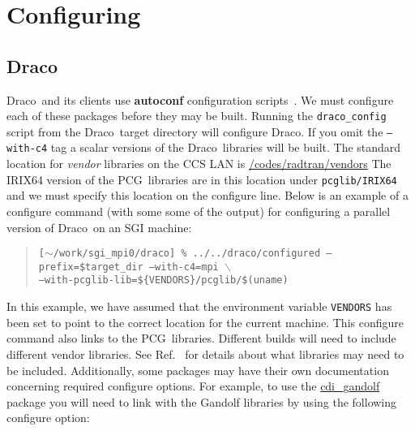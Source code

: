 \documentclass[10pt]{nmemo}
\newcommand{\comp}[1]{\normalfont\normalsize\texttt{#1}}
\newcommand{\draco}{{\normalfont\sffamily Draco}}
\newcommand{\pcg}{{\normalfont\sffamily PCG}}
\begin{document}

\section{Configuring}
\label{configure}

\subsection{\draco}

\draco\ and its clients use \textbf{autoconf} configuration
scripts~\cite{autoconf}.  We must configure each of these packages
before they may be built.  Running the \comp{draco\_config} script
from the \draco\ target directory will configure \draco.  If you omit
the \comp{--with-c4} tag a scalar versions of the \draco\ libraries
will be built.  The standard location for \emph{vendor} libraries on
the CCS LAN is \url{/codes/radtran/vendors} The IRIX64 version of the
\pcg\ libraries are in this location under \comp{pcglib/IRIX64} and we
must specify this location on the configure line.  Below is an example
of a configure command (with some some of the output) for configuring
a parallel version of \draco\ on an SGI machine:

\footnotesize
\begin{verse}
\texttt{[$\sim$/work/sgi\_mpi0/draco] \% ../../draco/configured --prefix=\${target\_dir} --with-c4=mpi $\backslash$\\
\hspace{0.5in}--with-pcglib-lib=\$\{VENDORS\}/pcglib/\$(uname)} \\
\end{verse}
\normalsize

In this example, we have assumed that the environment variable
\comp{VENDORS} has been set to point to the correct location for the
current machine. This configure command also links to the \pcg\ 
libraries.  Different builds will need to include different vendor
libraries.  See Ref.~\cite{draco-build} for details about what
libraries may need to be included.  Additionally, some packages may
have their own documentation concerning required configure options.
For example, to use the \url{cdi_gandolf} package you will need to
link with the Gandolf libraries by using the following configure
option:
\end{document}
